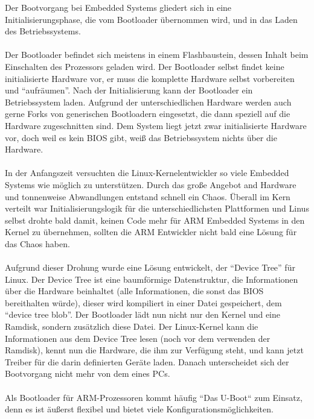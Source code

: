 \documentclass[a4paper]{article}
\begin{document}
Der Bootvorgang bei Embedded Systems gliedert sich in eine Initialisierungsphase, die vom Bootloader übernommen wird, und in das Laden des Betriebssystems.\\\\
Der Bootloader befindet sich meistens in einem Flashbaustein, dessen Inhalt beim Einschalten des Prozessors geladen wird. Der Bootloader selbst findet keine initialisierte Hardware vor, er muss die komplette Hardware selbst vorbereiten und “aufräumen”. Nach der Initialisierung kann der Bootloader ein Betriebssystem laden. Aufgrund der unterschiedlichen Hardware werden auch gerne Forks von generischen Bootloadern eingesetzt, die dann speziell auf die Hardware zugeschnitten sind. Dem System liegt jetzt zwar initialisierte Hardware vor, doch weil es kein BIOS gibt, weiß das Betriebssystem nichts über die Hardware.\\\\
In der Anfangszeit versuchten die Linux-Kernelentwickler so viele Embedded Systems wie möglich zu unterstützen. Durch das große Angebot and Hardware und tonnenweise Abwandlungen entstand schnell ein Chaos. Überall im Kern verteilt war Initialisierungslogik für die unterschiedlichsten Plattformen und Linus selbst drohte bald damit, keinen Code mehr für ARM Embedded Systems in den Kernel zu übernehmen, sollten die ARM Entwickler nicht bald eine Lösung  für das Chaos haben.\\\\
Aufgrund dieser Drohung wurde eine Lösung entwickelt, der “Device Tree” für Linux. Der Device Tree ist eine baumförmige Datenstruktur, die Informationen über die Hardware beinhaltet (alle Informationen, die sonst das BIOS bereithalten würde), dieser wird kompiliert in einer Datei gespeichert, dem “device tree blob”. Der Bootloader lädt nun nicht nur den Kernel und eine Ramdisk, sondern zusätzlich diese Datei. Der Linux-Kernel kann die Informationen aus dem Device Tree lesen (noch vor dem verwenden der Ramdisk), kennt nun die Hardware, die ihm zur Verfügung steht, und kann jetzt Treiber für die darin definierten Geräte laden. Danach unterscheidet sich der Bootvorgang nicht mehr von dem eines PCs.\\\\

Als Bootloader für ARM-Prozessoren kommt häufig “Das U-Boot“ zum Einsatz, denn es ist äußerst flexibel und bietet viele Konfigurationsmöglichkeiten.
\end{document}
